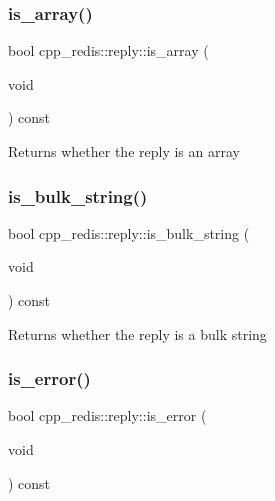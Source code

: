\subsubsection{\texorpdfstring{is\+\_\+array()}{is\_array()}}
{\footnotesize\ttfamily bool cpp\+\_\+redis\+::reply\+::is\+\_\+array (\begin{DoxyParamCaption}\item[{void}]{ }\end{DoxyParamCaption}) const}

\begin{DoxyReturn}{Returns}
whether the reply is an array 
\end{DoxyReturn}
\mbox{\label{classcpp__redis_1_1reply_ab1f4e57a33fb438ab165a65f2d31ca8d}} 
\subsubsection{\texorpdfstring{is\+\_\+bulk\+\_\+string()}{is\_bulk\_string()}}
{\footnotesize\ttfamily bool cpp\+\_\+redis\+::reply\+::is\+\_\+bulk\+\_\+string (\begin{DoxyParamCaption}\item[{void}]{ }\end{DoxyParamCaption}) const}

\begin{DoxyReturn}{Returns}
whether the reply is a bulk string 
\end{DoxyReturn}
\mbox{\label{classcpp__redis_1_1reply_af61ba1b5a0617c0036fb69e7ad5ee159}} 
\subsubsection{\texorpdfstring{is\+\_\+error()}{is\_error()}}
{\footnotesize\ttfamily bool cpp\+\_\+redis\+::reply\+::is\+\_\+error (\begin{DoxyParamCaption}\item[{void}]{ }\end{DoxyParamCaption}) const}

